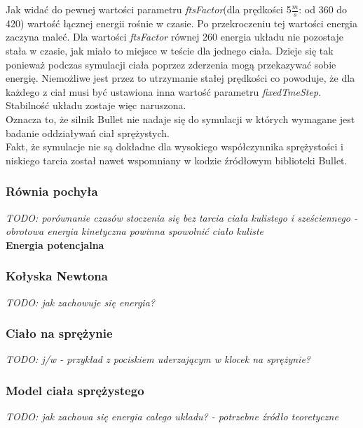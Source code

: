 Jak widać do pewnej wartości parametru \emph{ftsFactor}(dla prędkości 5$
\frac{m}{s} $: od 360 do 420) wartość łącznej energii rośnie w czasie. Po
przekroczeniu tej wartości energia zaczyna maleć. Dla wartości \emph{ftsFactor}
równej 260 energia układu nie pozostaje stała w czasie, jak miało to miejsce w
teście dla jednego ciała. Dzieje się tak ponieważ podczas symulacji ciała
poprzez zderzenia mogą przekazywać sobie energię. Niemożliwe jest przez to
utrzymanie stałej prędkości co powoduje, że dla każdego z ciał musi być
ustawiona inna wartość parametru \emph{fixedTmeStep}. Stabilność układu zostaje
więc naruszona.\\
Oznacza to, że silnik Bullet nie nadaje się do symulacji w których wymagane jest
badanie oddziaływań ciał sprężystych.\\
Fakt, że symulacje nie są dokładne dla wysokiego współczynnika sprężystości i
niskiego tarcia został nawet wspomniany w kodzie źródłowym biblioteki Bullet.




\subsubsection{Równia pochyła}
\emph{TODO: porównanie czasów stoczenia się bez tarcia ciała kulistego i
sześciennego - obrotowa energia kinetyczna powinna spowolnić ciało kuliste}\\
\textbf{Energia potencjalna}\\

\subsubsection{Kołyska Newtona}
\emph{TODO: jak zachowuje się energia?}

\subsubsection{Ciało na sprężynie}
\emph{TODO: j/w - przykład z pociskiem uderzającym w klocek na sprężynie?}

\subsubsection{Model ciała sprężystego}
\emph{TODO: jak zachowa się energia całego układu? - potrzebne źródło
teoretyczne}


